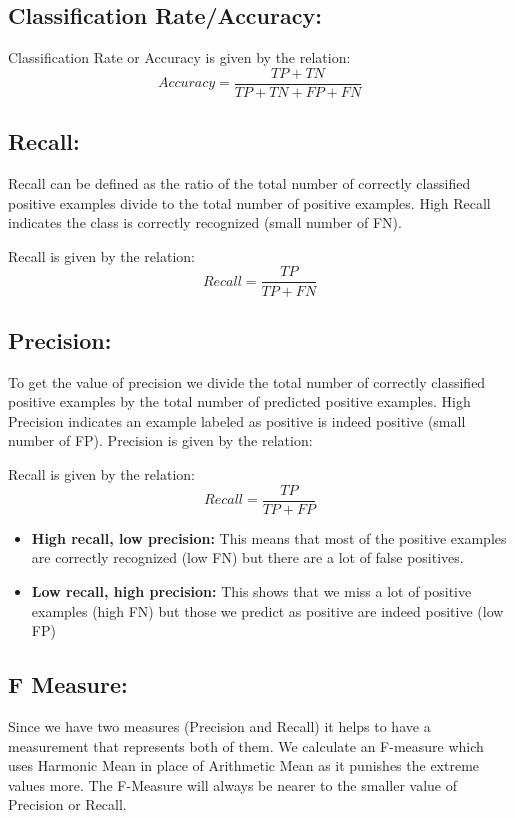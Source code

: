 \documentclass{report}
\begin{document}
\subsection{Classification Rate/Accuracy:}
Classification Rate or Accuracy is given by the relation:
\[Accuracy = \frac{TP + TN}{TP + TN + FP + FN}\]

\subsection{Recall: }
Recall can be defined as the ratio of the total number of correctly classified positive examples divide to the total number of positive examples. High Recall indicates the class is correctly recognized (small number of FN).

Recall is given by the relation:
\[Recall = \frac{TP}{TP + FN}\]


\subsection{Precision: }
To get the value of precision we divide the total number of correctly classified positive examples by the total number of predicted positive examples. High Precision indicates an example labeled as positive is indeed positive (small number of FP).
Precision is given by the relation:

Recall is given by the relation:
\[Recall = \frac{TP}{TP + FP}\]

\begin{itemize}

\item \textbf{High recall, low precision:}
This means that most of the positive examples are correctly recognized (low FN) but there are a lot of false positives.

\item \textbf{Low recall, high precision:}
This shows that we miss a lot of positive examples (high FN) but those we predict as positive are indeed positive (low FP)
\end{itemize}

\subsection{F Measure: }
Since we have two measures (Precision and Recall) it helps to have a measurement that represents both of them. We calculate an F-measure which uses Harmonic Mean in place of Arithmetic Mean as it punishes the extreme values more.
The F-Measure will always be nearer to the smaller value of Precision or Recall.
\end{document}
